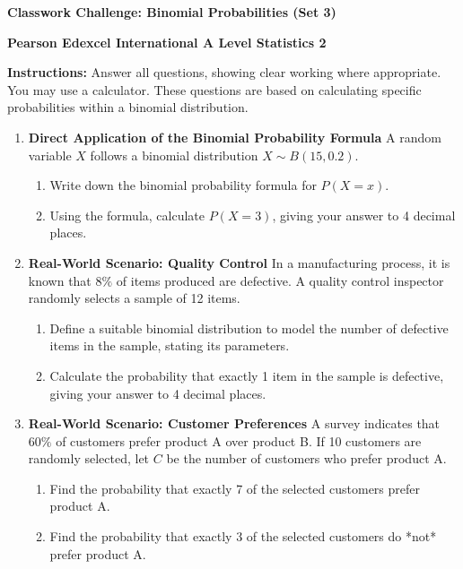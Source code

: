 \documentclass[12pt]{article}
\begin{document}
\centerline{\Large\textbf{Classwork Challenge: Binomial Probabilities (Set 3)}}
\centerline{\textbf{Pearson Edexcel International A Level Statistics 2}}

\vspace{0.5cm}
\textbf{Instructions:} Answer all questions, showing clear working where appropriate. You may use a calculator. These questions are based on calculating specific probabilities within a binomial distribution.
\vspace{0.5cm}

\begin{enumerate}
    \item \textbf{Direct Application of the Binomial Probability Formula}
    A random variable $X$ follows a binomial distribution $X \sim B(15, 0.2)$.
    \begin{enumerate}
        \item Write down the binomial probability formula for $P(X=x)$.
        \item Using the formula, calculate $P(X=3)$, giving your answer to 4 decimal places.
    \end{enumerate}

    \item \textbf{Real-World Scenario: Quality Control}
    In a manufacturing process, it is known that $8\%$ of items produced are defective. A quality control inspector randomly selects a sample of 12 items.
    \begin{enumerate}
        \item Define a suitable binomial distribution to model the number of defective items in the sample, stating its parameters.
        \item Calculate the probability that exactly 1 item in the sample is defective, giving your answer to 4 decimal places.
    \end{enumerate}

    \item \textbf{Real-World Scenario: Customer Preferences}
    A survey indicates that $60\%$ of customers prefer product A over product B. If 10 customers are randomly selected, let $C$ be the number of customers who prefer product A.
    \begin{enumerate}
        \item Find the probability that exactly 7 of the selected customers prefer product A.
        \item Find the probability that exactly 3 of the selected customers do *not* prefer product A.
    \end{enumerate}


\end{enumerate}
\end{document}
